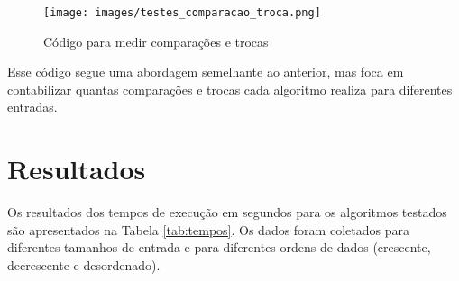 \documentclass[12pt,a4paper]{article}
\begin{document}
\begin{figure}[H]
    \centering
    \texttt{[image: images/testes\_comparacao\_troca.png]}
    \caption{Código para medir comparações e trocas}
    \label{fig:testes_comparacao}
\end{figure}

Esse código segue uma abordagem semelhante ao anterior, mas foca em contabilizar quantas comparações e trocas cada algoritmo realiza para diferentes entradas.

\section{Resultados}
Os resultados dos tempos de execução em segundos para os algoritmos testados são apresentados na Tabela \ref{tab:tempos}. Os dados foram coletados para diferentes tamanhos de entrada e para diferentes ordens de dados (crescente, decrescente e desordenado).
\end{document}

